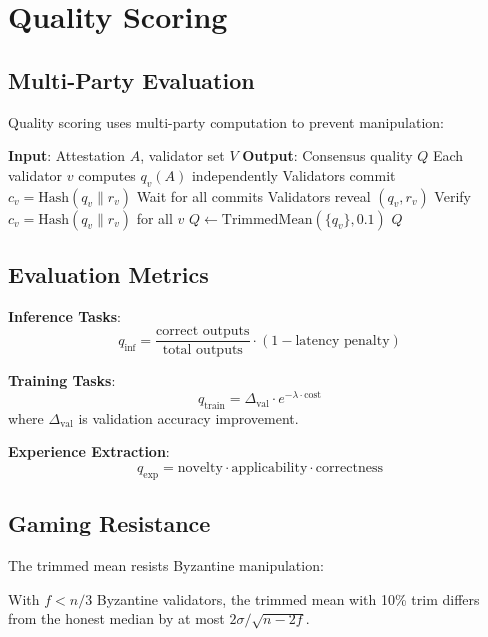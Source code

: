 \section{Quality Scoring}

\label{sec:quality}

\subsection{Multi-Party Evaluation}

Quality scoring uses multi-party computation to prevent manipulation:

\begin{algorithm}[t]
\caption{Multi-Party Quality Evaluation}
\label{alg:mpe}
\begin{algorithmic}[1]
\STATE \textbf{Input}: Attestation $A$, validator set $V$
\STATE \textbf{Output}: Consensus quality $Q$
\STATE Each validator $v$ computes $q_v(A)$ independently
\STATE Validators commit $c_v = \text{Hash}(q_v \| r_v)$
\STATE Wait for all commits
\STATE Validators reveal $(q_v, r_v)$
\STATE Verify $c_v = \text{Hash}(q_v \| r_v)$ for all $v$
\STATE $Q \leftarrow \text{TrimmedMean}(\{q_v\}, 0.1)$
\RETURN $Q$
\end{algorithmic}
\end{algorithm}

\subsection{Evaluation Metrics}

\textbf{Inference Tasks}:
\begin{equation}
q_{\text{inf}} = \frac{\text{correct outputs}}{\text{total outputs}} \cdot (1 - \text{latency penalty})
\end{equation}

\textbf{Training Tasks}:
\begin{equation}
q_{\text{train}} = \Delta_{\text{val}} \cdot e^{-\lambda \cdot \text{cost}}
\end{equation}
where $\Delta_{\text{val}}$ is validation accuracy improvement.

\textbf{Experience Extraction}:
\begin{equation}
q_{\text{exp}} = \text{novelty} \cdot \text{applicability} \cdot \text{correctness}
\end{equation}

\subsection{Gaming Resistance}

The trimmed mean resists Byzantine manipulation:

\begin{theorem}
With $f < n/3$ Byzantine validators, the trimmed mean with 10\% trim differs from the honest median by at most $2\sigma / \sqrt{n-2f}$.
\end{theorem}

